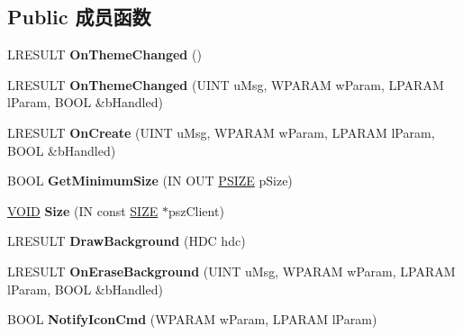\subsection*{Public 成员函数}
\begin{DoxyCompactItemize}
\item 
\mbox{\label{class_c_tray_notify_wnd_ac825d85f47bcad1c24b6e145802b79a3}} 
L\+R\+E\+S\+U\+LT {\bfseries On\+Theme\+Changed} ()
\item 
\mbox{\label{class_c_tray_notify_wnd_ab1da6cb76e5a4935d3e31a2dfb4da219}} 
L\+R\+E\+S\+U\+LT {\bfseries On\+Theme\+Changed} (U\+I\+NT u\+Msg, W\+P\+A\+R\+AM w\+Param, L\+P\+A\+R\+AM l\+Param, B\+O\+OL \&b\+Handled)
\item 
\mbox{\label{class_c_tray_notify_wnd_aff16cf02581ec43c03e7d0a6363e278e}} 
L\+R\+E\+S\+U\+LT {\bfseries On\+Create} (U\+I\+NT u\+Msg, W\+P\+A\+R\+AM w\+Param, L\+P\+A\+R\+AM l\+Param, B\+O\+OL \&b\+Handled)
\item 
\mbox{\label{class_c_tray_notify_wnd_a35a62f9f876d5ce4d55b3d31c6c709c1}} 
B\+O\+OL {\bfseries Get\+Minimum\+Size} (IN O\+UT \hyperlink{structtag_s_i_z_e}{P\+S\+I\+ZE} p\+Size)
\item 
\mbox{\label{class_c_tray_notify_wnd_af6fded85122e3d8656447c1ed3bc1fda}} 
\hyperlink{interfacevoid}{V\+O\+ID} {\bfseries Size} (IN const \hyperlink{structtag_s_i_z_e}{S\+I\+ZE} $\ast$psz\+Client)
\item 
\mbox{\label{class_c_tray_notify_wnd_a28c66eee6e82bb04c7a6754ad81c9707}} 
L\+R\+E\+S\+U\+LT {\bfseries Draw\+Background} (H\+DC hdc)
\item 
\mbox{\label{class_c_tray_notify_wnd_a3fddc43ebb4a35766c013bbd3c025860}} 
L\+R\+E\+S\+U\+LT {\bfseries On\+Erase\+Background} (U\+I\+NT u\+Msg, W\+P\+A\+R\+AM w\+Param, L\+P\+A\+R\+AM l\+Param, B\+O\+OL \&b\+Handled)
\item 
\mbox{\label{class_c_tray_notify_wnd_a243764574278b7dff8bcca30f647cf4f}} 
B\+O\+OL {\bfseries Notify\+Icon\+Cmd} (W\+P\+A\+R\+AM w\+Param, L\+P\+A\+R\+AM l\+Param)

\end{DoxyCompactItemize}

